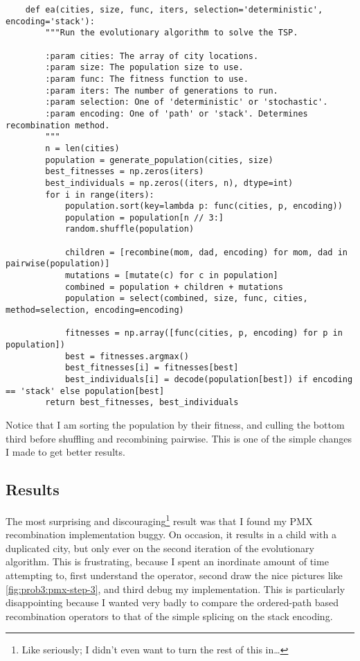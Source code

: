 \documentclass{article}
\begin{document}
\begin{verbatim}
    def ea(cities, size, func, iters, selection='deterministic', encoding='stack'):
        """Run the evolutionary algorithm to solve the TSP.

        :param cities: The array of city locations.
        :param size: The population size to use.
        :param func: The fitness function to use.
        :param iters: The number of generations to run.
        :param selection: One of 'deterministic' or 'stochastic'.
        :param encoding: One of 'path' or 'stack'. Determines recombination method.
        """
        n = len(cities)
        population = generate_population(cities, size)
        best_fitnesses = np.zeros(iters)
        best_individuals = np.zeros((iters, n), dtype=int)
        for i in range(iters):
            population.sort(key=lambda p: func(cities, p, encoding))
            population = population[n // 3:]
            random.shuffle(population)

            children = [recombine(mom, dad, encoding) for mom, dad in pairwise(population)]
            mutations = [mutate(c) for c in population]
            combined = population + children + mutations
            population = select(combined, size, func, cities, method=selection, encoding=encoding)

            fitnesses = np.array([func(cities, p, encoding) for p in population])
            best = fitnesses.argmax()
            best_fitnesses[i] = fitnesses[best]
            best_individuals[i] = decode(population[best]) if encoding == 'stack' else population[best]
        return best_fitnesses, best_individuals
\end{verbatim}

Notice that I am sorting the population by their fitness, and culling the bottom third before
shuffling and recombining pairwise. This is one of the simple changes I made to get better results.

\subsection{Results}
The most surprising and discouraging\footnote{Like seriously; I didn't even want to turn the rest
    of this in\dots} result was that I found my PMX recombination implementation
buggy. On occasion, it results in a child with a duplicated city, but only ever on the second
iteration of the evolutionary algorithm. This is frustrating, because I spent an inordinate amount
of time attempting to, first understand the operator, second draw the nice pictures like
\autoref{fig:prob3:pmx-step-3}, and third debug my implementation. This is particularly
disappointing because I wanted very badly to compare the ordered-path based recombination operators
to that of the simple splicing on the stack encoding.
\end{document}
